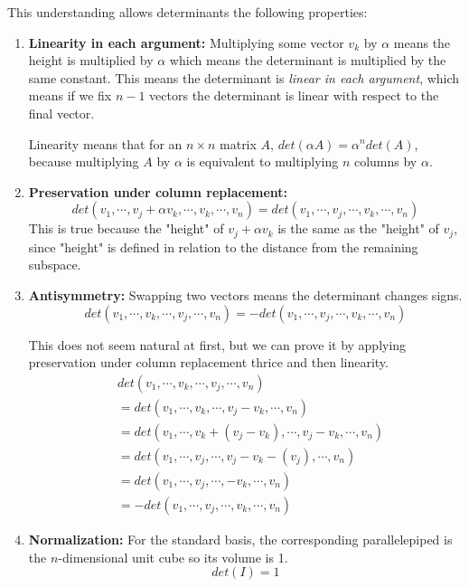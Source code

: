 This understanding allows determinants the following properties: 
\begin{enumerate}
	\item \textbf{Linearity in each argument: } Multiplying some vector $v_{k}$ by $\alpha$ means the height is multiplied by $\alpha$ which means the determinant is multiplied by the same constant. This means the determinant is \textit{linear in each argument}, which means if we fix $n-1$ vectors the determinant is linear with respect to the final vector. 
	
	Linearity means that for an $n \times n$ matrix $A$,  $det(\alpha A) = \alpha^{n} det(A)$, because multiplying $A$ by $\alpha$ is equivalent to multiplying $n$ columns by $\alpha$. 
	\item \textbf{Preservation under column replacement: } 
	$$det(v_{1}, \cdots, v_{j} + \alpha v_{k}, \cdots, v_{k}, \cdots, v_{n}) = det(v_{1}, \cdots, v_{j}, \cdots, v_{k}, \cdots, v_{n})$$
	This is true because the "height" of $v_{j} + \alpha v_{k}$ is the same as the "height" of $v_{j}$, since "height" is defined in relation to the distance from the remaining subspace. 
	\item \textbf{Antisymmetry: } Swapping two vectors means the determinant changes signs. 
	$$det(v_{1}, \cdots, v_{k}, \cdots, v_{j}, \cdots, v_{n}) = -det(v_{1}, \cdots, v_{j}, \cdots, v_{k}, \cdots, v_{n})$$
	
This does not seem natural at first, but we can prove it by applying preservation under column replacement thrice and then linearity. 
$$ 
\begin{aligned}
&det(v_{1}, \cdots, v_{k}, \cdots, v_{j}, \cdots, v_{n}) \\ 
&= det(v_{1}, \cdots, v_{k}, \cdots, v_{j} - v_{k}, \cdots, v_{n}) \\
&= det(v_{1}, \cdots, v_{k} + (v_{j} - v_{k}), \cdots, v_{j} - v_{k}, \cdots, v_{n}) \\
&= det(v_{1}, \cdots, v_{j}, \cdots, v_{j} - v_{k} - (v_{j}), \cdots, v_{n}) \\
&= det(v_{1}, \cdots, v_{j}, \cdots, -v_{k}, \cdots, v_{n}) \\
&= -det(v_{1}, \cdots, v_{j}, \cdots, v_{k}, \cdots, v_{n}) 
\end{aligned}
$$

	\item \textbf{Normalization: } For the standard basis, the corresponding parallelepiped is the $n$-dimensional unit cube so its volume is 1. 
	$$det(I) = 1$$
\end{enumerate}

